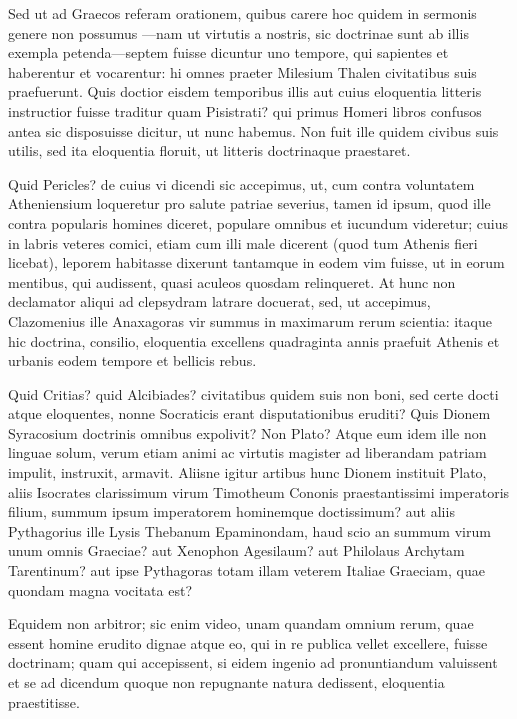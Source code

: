  Sed ut ad Graecos referam orationem, quibus carere hoc quidem in sermonis genere non possumus —nam ut virtutis a nostris, sic doctrinae sunt ab illis exempla petenda—septem fuisse dicuntur uno tempore, qui sapientes et haberentur et vocarentur: hi omnes praeter Milesium Thalen civitatibus suis praefuerunt. Quis doctior eisdem temporibus illis aut cuius eloquentia litteris instructior fuisse traditur quam Pisistrati? qui primus Homeri libros confusos antea sic disposuisse dicitur, ut nunc habemus. Non fuit ille quidem civibus suis utilis, sed ita eloquentia floruit, ut litteris doctrinaque praestaret.

 Quid Pericles? de cuius vi dicendi sic accepimus, ut, cum contra voluntatem Atheniensium loqueretur pro salute patriae severius, tamen id ipsum, quod ille contra popularis homines diceret, populare omnibus et iucundum videretur; cuius in labris veteres comici, etiam cum illi male dicerent (quod tum Athenis fieri licebat), leporem habitasse dixerunt tantamque in eodem vim fuisse, ut in eorum mentibus, qui audissent, quasi aculeos quosdam relinqueret. At hunc non declamator aliqui ad clepsydram latrare docuerat, sed, ut accepimus, Clazomenius ille Anaxagoras vir summus in maximarum rerum scientia: itaque hic doctrina, consilio, eloquentia excellens quadraginta annis praefuit Athenis et urbanis eodem tempore et bellicis rebus.

 Quid Critias? quid Alcibiades? civitatibus quidem suis non boni, sed certe docti atque eloquentes, nonne Socraticis erant disputationibus eruditi? Quis Dionem Syracosium doctrinis omnibus expolivit? Non Plato? Atque eum idem ille non linguae solum, verum etiam animi ac virtutis magister ad liberandam patriam impulit, instruxit, armavit. Aliisne igitur artibus hunc Dionem instituit Plato, aliis Isocrates clarissimum virum Timotheum Cononis praestantissimi imperatoris filium, summum ipsum imperatorem hominemque doctissimum? aut aliis Pythagorius ille Lysis Thebanum Epaminondam, haud scio an summum virum unum omnis Graeciae? aut Xenophon Agesilaum? aut Philolaus Archytam Tarentinum? aut ipse Pythagoras totam illam veterem Italiae Graeciam, quae quondam magna vocitata est?

 Equidem non arbitror; sic enim video, unam quandam omnium rerum, quae essent homine erudito dignae atque eo, qui in re publica vellet excellere, fuisse doctrinam; quam qui accepissent, si eidem ingenio ad pronuntiandum valuissent et se ad dicendum quoque non repugnante natura dedissent, eloquentia praestitisse.

